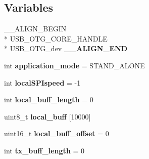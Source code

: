 \subsection*{Variables}
\begin{DoxyCompactItemize}
\item 
\hypertarget{group__USB__VCP__Private__Variables_ga8c1bc617dd09ee6c109e4feac076d11b}{\-\_\-\-\_\-\-A\-L\-I\-G\-N\-\_\-\-B\-E\-G\-I\-N \\*
U\-S\-B\-\_\-\-O\-T\-G\-\_\-\-C\-O\-R\-E\-\_\-\-H\-A\-N\-D\-L\-E \\*
U\-S\-B\-\_\-\-O\-T\-G\-\_\-dev {\bfseries \-\_\-\-\_\-\-A\-L\-I\-G\-N\-\_\-\-E\-N\-D}}\label{group__USB__VCP__Private__Variables_ga8c1bc617dd09ee6c109e4feac076d11b}

\item 
\hypertarget{group__USB__VCP__Private__Variables_gab0ec5f9ad30bc7e96bbab21465d0a3d9}{int {\bfseries application\-\_\-mode} = S\-T\-A\-N\-D\-\_\-\-A\-L\-O\-N\-E}\label{group__USB__VCP__Private__Variables_gab0ec5f9ad30bc7e96bbab21465d0a3d9}

\item 
\hypertarget{group__USB__VCP__Private__Variables_ga123fa2a777ea7f56eecc4eeebf65afb1}{int {\bfseries local\-S\-P\-Ispeed} = -\/1}\label{group__USB__VCP__Private__Variables_ga123fa2a777ea7f56eecc4eeebf65afb1}

\item 
\hypertarget{group__USB__VCP__Private__Variables_gafe5c98eeb78c2a7b7c327de82ae60aae}{int {\bfseries local\-\_\-buff\-\_\-length} = 0}\label{group__USB__VCP__Private__Variables_gafe5c98eeb78c2a7b7c327de82ae60aae}

\item 
\hypertarget{group__USB__VCP__Private__Variables_ga936c65c629e32a25291f19db8dcb44ff}{uint8\-\_\-t {\bfseries local\-\_\-buff} \mbox{[}10000\mbox{]}}\label{group__USB__VCP__Private__Variables_ga936c65c629e32a25291f19db8dcb44ff}

\item 
\hypertarget{group__USB__VCP__Private__Variables_gacf7aa71b21bb2a96ebacf3fde3703ef4}{uint16\-\_\-t {\bfseries local\-\_\-buff\-\_\-offset} = 0}\label{group__USB__VCP__Private__Variables_gacf7aa71b21bb2a96ebacf3fde3703ef4}

\item 
\hypertarget{group__USB__VCP__Private__Variables_ga9bbb8be21bb9a071903abb759c254c12}{int {\bfseries tx\-\_\-buff\-\_\-length} = 0}\label{group__USB__VCP__Private__Variables_ga9bbb8be21bb9a071903abb759c254c12}


\end{DoxyCompactItemize}
